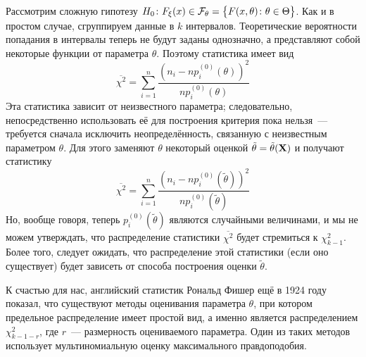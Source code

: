 Рассмотрим сложную гипотезу $H_0\colon F_{\xi}(x) \in \mathcal{F}_{\theta} = \bigl\{ F(x, \theta)\colon \theta \in \Theta\bigr\}$.
Как и в простом случае, сгруппируем данные в $k$ интервалов. 
Теоретические вероятности попадания в интервалы теперь не будут заданы однозначно, а представляют собой некоторые функции от параметра $\theta$.
Поэтому статистика имеет вид 
\begin{equation*}
    \overline{\chi^2} = \sum\limits_{i = 1}^{n} \frac{\left(n_i - n p_{i}^{(0)}(\theta)\right)^2}{n p_{i}^{(0)}(\theta)}
\end{equation*}
Эта статистика зависит от неизвестного параметра; следовательно, непосредственно использовать её для построения критерия пока нельзя~---
требуется сначала исключить неопределённость, связанную с неизвестным параметром $\theta$.
Для этого заменяют $\theta$ некоторый оценкой $\tilde{\theta} = \tilde{\theta}(\mathbf{X})$ и получают статистику
\begin{equation*}
    \overline{\chi^2} = \sum\limits_{i = 1}^{n} \frac{\left(n_i - n p_{i}^{(0)}(\tilde{\theta}) \right)^2}{n p_{i}^{(0)}(\tilde{\theta})}
\end{equation*}
Но, вообще говоря, теперь $p_{i}^{(0)}(\tilde{\theta})$ являются случайными величинами, и мы не можем утверждать, что распределение статистики $\overline{\chi^2}$ будет стремиться к $\chi^{2}_{k-1}$.
Более того, следует ожидать, что распределение этой статистики (если оно существует) будет зависеть от способа построения оценки $\tilde{\theta}$.

К счастью для нас, английский статистик Рональд Фишер ещё в 1924 году показал, что существуют методы оценивания параметра $\theta$, 
при котором предельное распределение имеет простой вид, а именно является распределением $\chi^{2}_{k - 1 - r}$, где $r$~--- размерность оцениваемого параметра.
Один из таких методов использует мультиномиальную оценку максимального правдоподобия.


